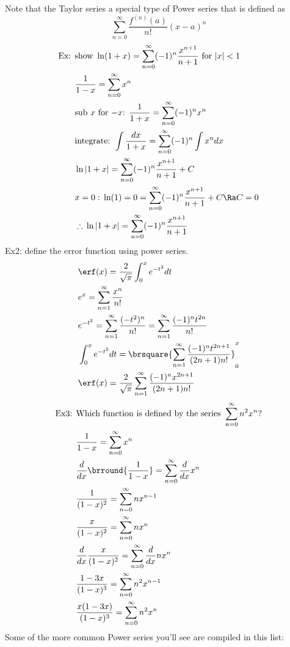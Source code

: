 Note that the Taylor series a special type of Power series that is defined as
$$\sum_{n=0}^\infty\frac{f^{(n)}(a)}{n!}(x-a)^n$$
\begin{align*}
    \text{Ex: }&\text{show }\ln(1+x)=\sum_{n=0}^\infty(-1)^n\frac{x^{n+1}}{n+1}\text{ for }|x|<1\\
    &\frac{1}{1-x}=\sum_{n=0}^\infty x^n\\
    &\text{sub $x$ for $-x$: }\frac{1}{1+x}=\sum_{n=0}^\infty(-1)^nx^n\\
    &\text{integrate: }\int\frac{dx}{1+x}=\sum_{n=0}^\infty(-1)^n\int x^ndx\\
    &\ln|1+x|=\sum_{n=0}^\infty(-1)^n\frac{x^{n+1}}{n+1}+C\\
    &x=0:\,\ln(1)=0=\sum_{n=0}^\infty(-1)^n\frac{x^{n+1}}{n+1}+C\Ra C=0\\
    &\therefore\,\ln|1+x|=\sum_{n=0}^\infty(-1)^n\frac{x^{n+1}}{n+1}
\end{align*}
Ex2: define the error function using power series.
\begin{align*}
    &\erf(x)=\frac{2}{\sqrt{\pi}}\int_0^xe^{-t^2}dt\\
    &e^x=\sum_{n=1}^\infty\frac{x^n}{n!}\\
    &e^{-t^2}=\sum_{n=1}^\infty\frac{(-t^2)^{n}}{n!}=\sum_{n=1}^\infty\frac{(-1)^nt^{2n}}{n!}\\
    &\int_0^x e^{-t^2}dt=\brsquare{\sum_{n=1}^\infty\frac{(-1)^nt^{2n+1}}{(2n+1)n!}}_0^x\\
    &\erf(x)=\frac{2}{\sqrt{\pi}}\sum_{n=1}^\infty\frac{(-1)^nx^{2n+1}}{(2n+1)n!}
\end{align*}
\begin{align*}
    \text{Ex3: }&\text{Which function is defined by the series }\sum_{n=0}^\infty n^2x^n\text{?}\\
    &\frac{1}{1-x}=\sum_{n=0}^\infty x^n\\
    &\frac{d}{dx}\brround{\frac{1}{1-x}}=\sum_{n=0}^\infty\frac{d}{dx}x^n\\
    &\frac{1}{(1-x)^2}=\sum_{n=0}^\infty nx^{n-1}\\
    &\frac{x}{(1-x)^2}=\sum_{n=0}^\infty nx^n\\
    &\frac{d}{dx}\frac{x}{(1-x)^2}=\sum_{n=0}^\infty\frac{d}{dx} nx^n\\
    &\frac{1-3x}{(1-x)^3}=\sum_{n=0}^\infty n^2x^{n-1}\\
    &\frac{x(1-3x)}{(1-x)^3}=\sum_{n=0}^\infty n^2x^n\\
\end{align*}
Some of the more common Power series you'll see are compiled in this list:
